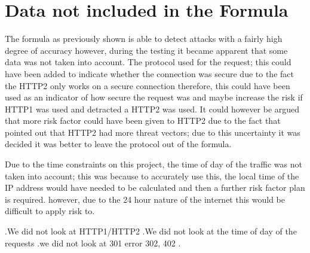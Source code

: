 \section{Data not included in the Formula}

The formula as previously shown is able to detect attacks with a fairly high degree of accuracy however, during the testing it became apparent that some data was not taken into account. The protocol used for the request; this could have been added to indicate whether the connection was secure due to the fact the HTTP2 only works on a secure connection therefore, this could have been used as an indicator of how secure the request was and maybe increase the risk if HTTP1 was used and detracted a HTTP2 was used. It could however be argued that more risk factor could have been given to HTTP2 due to the fact that \cite{tripathi2018slow} pointed out that HTTP2 had more threat vectors; due to this uncertainty it was decided it was better to leave the protocol out of the formula. 

Due to the time constraints on this project, the time of day of the traffic was not taken into account; this was because to accurately use this, the local time of the IP address would have needed to be calculated and then a further risk factor plan is required. however, due to the 24 hour nature of the internet this would be difficult to apply risk to.

.We did not look at HTTP1/HTTP2 
.We did not look at the time of day of the requests
.we did not look at 301 error 302, 402
.